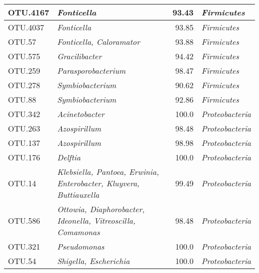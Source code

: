 {\begin{longtable}{l>{\itshape}p{8cm}r>{\itshape}l}
OTU.4167 & Fonticella & 93.43 & Firmicutes \\ \midrule
OTU.4037 & Fonticella & 93.85 & Firmicutes \\ \midrule
OTU.57 & Fonticella, Caloramator & 93.88 & Firmicutes \\ \midrule
OTU.575 & Gracilibacter & 94.42 & Firmicutes \\ \midrule
OTU.259 & Parasporobacterium & 98.47 & Firmicutes \\ \midrule
OTU.278 & Symbiobacterium & 90.62 & Firmicutes \\ \midrule
OTU.88 & Symbiobacterium & 92.86 & Firmicutes \\ \midrule
OTU.342 & Acinetobacter & 100.0 & Proteobacteria \\ \midrule
OTU.263 & Azospirillum & 98.48 & Proteobacteria \\ \midrule
OTU.137 & Azospirillum & 98.98 & Proteobacteria \\ \midrule
OTU.176 & Delftia & 100.0 & Proteobacteria \\ \midrule
OTU.14 & Klebsiella, Pantoea, Erwinia, Enterobacter, Kluyvera, Buttiauxella & 99.49 & Proteobacteria \\ \midrule
OTU.586 & Ottowia, Diaphorobacter, Ideonella, Vitreoscilla, Comamonas & 98.48 & Proteobacteria \\ \midrule
OTU.321 & Pseudomonas & 100.0 & Proteobacteria \\ \midrule
OTU.54 & Shigella, Escherichia & 100.0 & Proteobacteria \\ %
    \bottomrule
\end{longtable}}{}
